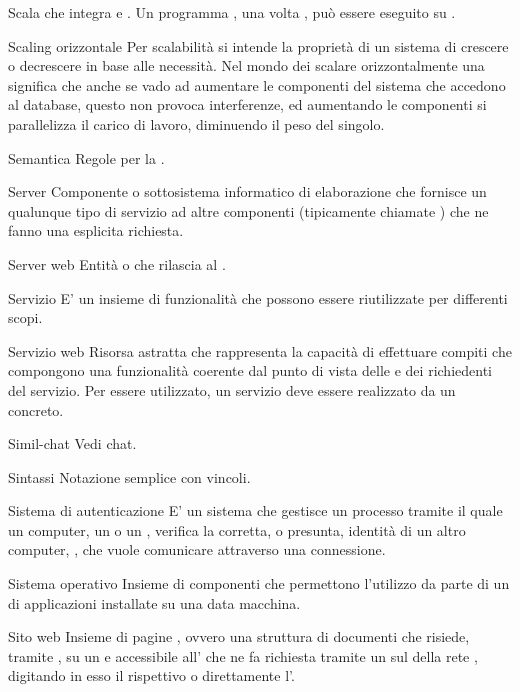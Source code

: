
\elemento
{Scala}
{ che integra  e . Un programma , una volta , può essere eseguito su .}

\elemento
{Scaling orizzontale}
{Per scalabilità si intende la proprietà di un sistema di crescere o decrescere in base alle necessità. Nel mondo dei  scalare orizzontalmente una  significa che anche se vado ad aumentare le componenti del sistema che accedono al database, questo non provoca interferenze, ed aumentando le componenti si parallelizza il carico di lavoro, diminuendo il peso del singolo.
}

\elemento
{Semantica}
{Regole per la .}

\elemento
{Server}
{Componente o sottosistema informatico di elaborazione che fornisce un qualunque tipo di servizio ad altre componenti (tipicamente chiamate ) che ne fanno una esplicita richiesta.}

\elemento
{Server web}
{Entità  o  che rilascia  al .}

\elemento
{Servizio}
{E' un insieme di funzionalità  che possono essere riutilizzate per differenti scopi.}

\elemento
{Servizio web}
{Risorsa astratta che rappresenta la capacità di effettuare compiti che compongono una funzionalità coerente dal punto di vista delle  e dei richiedenti del servizio. Per essere utilizzato, un servizio deve essere realizzato da un  concreto.}

\elemento
{Simil-chat}
{Vedi chat.}


\elemento
{Sintassi}
{Notazione semplice con vincoli.}

\elemento
{Sistema di autenticazione}
{E' un sistema che gestisce un processo tramite il quale un computer, un  o un , verifica la corretta, o presunta, identità di un altro computer, , che vuole comunicare attraverso una connessione.}

\elemento
{Sistema operativo}
{Insieme di componenti  che permettono l'utilizzo da parte di un  di applicazioni installate su una data macchina.}

\elemento
{Sito web}
{Insieme di pagine , ovvero una struttura  di documenti che risiede, tramite , su un  e accessibile all' che ne fa richiesta tramite un  sul  della rete , digitando in esso il rispettivo  o direttamente l'.}

